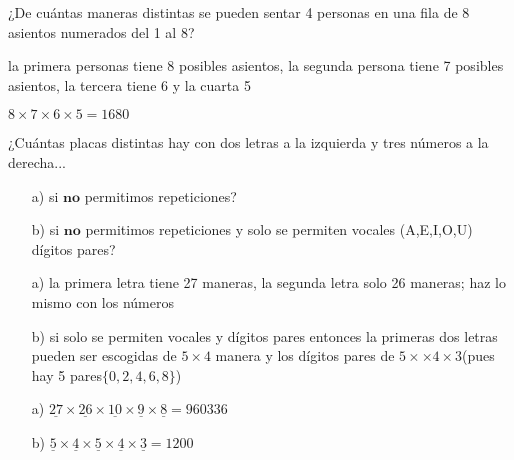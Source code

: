 \documentclass[11pt]{scrartcl}
\begin{document}
\begin{problem}
    ¿De cuántas maneras distintas se pueden sentar 4 personas en una fila de 8 asientos numerados
del 1 al 8? 
\begin{hint}
    la primera personas tiene 8 posibles asientos, la segunda persona tiene 7 posibles asientos, la tercera tiene 6 y la cuarta 5
\end{hint}
\begin{answer}
    $8\times 7\times 6\times 5=1680$
\end{answer}
\end{problem}
\vspace{0.1cm}
\begin{problem}
    ¿Cuántas placas distintas hay con dos letras a la izquierda y tres números a la
derecha... 
\begin{itemize}
    \item[a)] si $\textbf{no}$ permitimos repeticiones?
    \item[b)]  si $\textbf{no}$ permitimos repeticiones y solo se permiten vocales (A,E,I,O,U)  dígitos pares?
\end{itemize}

\begin{hint}
\begin{itemize}
    \item[a)] la primera letra tiene 27 maneras, la segunda letra solo 26 maneras; haz lo mismo con los números
     \item [b)] si solo se permiten vocales y dígitos pares entonces la primeras dos letras pueden ser escogidas de $5\times 4$ manera y los dígitos pares de $5\times\times 4\times 3$(pues hay 5 pares$\{0,2,4,6,8\}$)
     \end{itemize}
\end{hint}
\begin{answer}
   \begin{itemize}
       \item [a)] $\underline{27}\times \underline{26}\times \underline{10}\times\underline{9}\times\underline{8}=960336$
       \item [b)]$\underline{5}\times \underline{4}\times \underline{5}\times\underline{4}\times\underline{3}=1200$
   \end{itemize}
\end{answer}
\end{problem}
\vspace*{0.1cm}
\end{document}
